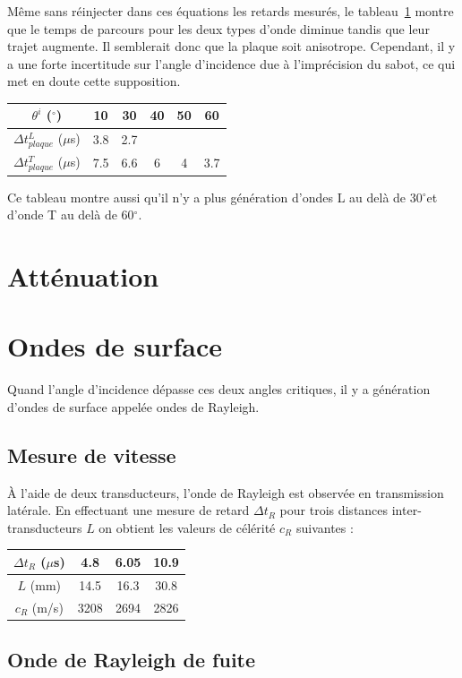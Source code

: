 \documentclass[twoside]{article}
\renewcommand{\degre}{$^{\circ}$}
\begin{document}
\begin{multicols}{2}
Même sans réinjecter dans ces équations les retards mesurés, le tableau~\ref{tab} montre que le temps de parcours pour les deux types d'onde diminue tandis que leur trajet augmente. Il semblerait donc que la plaque soit anisotrope. Cependant, il y a une forte incertitude sur l'angle d'incidence due à l'imprécision du sabot, ce qui met en doute cette supposition.

\begin{table}[H]
	\begin{tabular}{c|c|c|c|c|c}
		$\theta^{i}$ ($^{\circ}$)  & 10 & 30 & 40 & 50 & 60\\ \hline
		$\Delta t_{plaque}^L$ ($\mu$s)& 3.8 & 2.7 & & &   \\ \hline
		$\Delta t_{plaque}^T$ ($\mu$s) &7.5& 6.6 & 6 & 4 & 3.7\\ 
	\end{tabular}
	\label{tab}
\end{table}

Ce tableau montre aussi qu'il n'y a plus génération d'ondes L au delà de 30\degre et d'onde T au delà de 60\degre.

\section{Atténuation}

\section{Ondes de surface}

Quand l'angle d'incidence dépasse ces deux angles critiques, il y a génération d'ondes de surface appelée ondes de Rayleigh.
\subsection{Mesure de vitesse}
À l'aide de deux transducteurs, l'onde de Rayleigh est observée en transmission latérale. En effectuant une mesure de retard $\Delta t_R$ pour trois distances inter-transducteurs $L$ on obtient les valeurs de célérité $c_R$ suivantes :

\begin{tabular}{c|c| c | c}
$\Delta t_R$ ($\mu$s) &4.8 & 6.05 & 10.9 \\ \hline
$L$ (mm) & 14.5 & 16.3 & 30.8 \\ \hline
$c_R$ (m/s) &3208 & 2694 & 2826
\end{tabular}

\subsection{Onde de Rayleigh de fuite}



\end{multicols}
\end{document}
